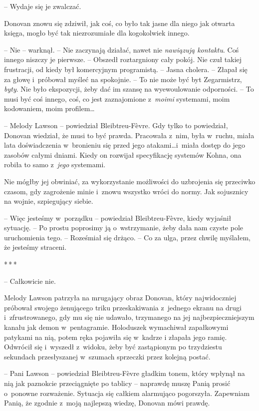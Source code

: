\documentclass[oneside,polish,11pt,sfheadings]{mwbk}
\newcommand{\threeast}{\bigskip\par\centerline{*\,*\,*}\medskip\par}%
\begin{document}
-- Wydaje się je zwalczać.

Donovan znowu się zdziwił, jak coś, co było tak jasne dla niego jak
otwarta księga, mogło być tak niezrozumiałe dla kogokolwiek innego.

-- Nie -- warknął. -- Nie zaczynają działać, nawet nie \emph{nawiązują
kontaktu}. Coś innego niszczy je pierwsze. -- Obszedł roztargniony cały
pokój. Nie czuł takiej frustracji, od kiedy był komercyjnym programistą.
-- Jasna cholera. -- Złapał się za głowę i~próbował myśleć na spokojnie. -- To nie może być byt Zegarmistrz, \emph{byty}. Nie było ekspozycji, żeby
dać im szansę na wyewoulowanie odporności. -- To musi być coś innego,
coś, co jest zaznajomione z~\emph{moimi} systemami, moim kodowaniem,
moim profilem\ldots

-- Melody Lawson -- powiedział Bleibtreu-Fèvre. Gdy tylko to powiedział,
Donovan wiedział, że musi to być prawda. Pracowała z~nim, była w~ruchu,
miała lata doświadczenia w~bronieniu się przed jego atakami\ldots i~miała
dostęp do jego zasobów całymi dniami. Kiedy on rozwijał specyfikację
systemów Kohna, ona robiła to samo z~\emph{jego} systemami.

Nie mógłby jej obwiniać, za wykorzystanie możliwości do uzbrojenia się
przeciwko czasom, gdy zagrożenie minie i~znowu wszystko wróci do normy.
Jak sojusznicy na wojnie, szpiegujący siebie.

-- Więc jesteśmy w~porządku -- powiedział Bleibtreu-Fèvre, kiedy wyjaśnił
sytuację. -- Po prostu poprosimy ją o~wstrzymanie, żeby dała nam czyste
pole uruchomienia tego. -- Roześmiał się drżąco. -- Co za ulga, przez
chwilę myślałem, że jesteśmy straceni.

\threeast

-- Całkowicie nie.

Melody Lawson patrzyła na mrugający obraz Donovan, który najwidoczniej
próbował swojego żenującego triku przeskakiwania z~jednego ekranu na
drugi i~zfrustrowanego, gdy mu się nie udawało, trzymanego na jej
najbezpieczniejszym kanału jak demon w~pentagramie. Holoduszek
wymachiwał zapałkowymi patykami na nią, potem ręka pojawiła się w~kadrze
i złapała jego ramię. Odwrócił się i~wyszedł z~widoku, żeby być
zastąpionym po trzydziestu sekundach przesłyszanej w~szumach sprzeczki
przez kolejną postać.

-- Pani Lawson -- powiedział Bleibtreu-Fèvre gładkim tonem, który wpłynął
na nią jak paznokcie przeciągnięte po tablicy -- naprawdę muszę Panią
prosić o~ponowne rozważenie. Sytuacja się całkiem alarmująco pogorszyła.
Zapewniam Panią, że zgodnie z~moją najlepszą wiedzę, Donovan mówi
prawdę.
\end{document}
